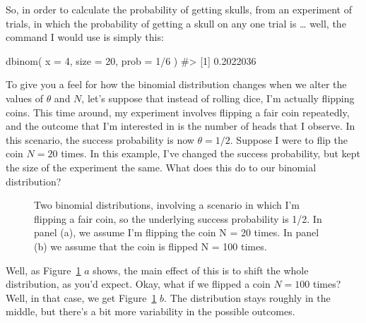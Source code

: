 \documentclass[
  letterpaper,
  DIV=11,
  numbers=noendperiod]{scrreprt}
\newenvironment{Shaded}{\begin{snugshade}}{\end{snugshade}}
\newcommand{\AttributeTok}[1]{\textcolor[rgb]{0.40,0.45,0.13}{#1}}
\newcommand{\CommentTok}[1]{\textcolor[rgb]{0.37,0.37,0.37}{#1}}
\newcommand{\DecValTok}[1]{\textcolor[rgb]{0.68,0.00,0.00}{#1}}
\newcommand{\FunctionTok}[1]{\textcolor[rgb]{0.28,0.35,0.67}{#1}}
\newcommand{\NormalTok}[1]{\textcolor[rgb]{0.00,0.23,0.31}{#1}}
\newcommand{\SpecialCharTok}[1]{\textcolor[rgb]{0.37,0.37,0.37}{#1}}
\begin{document}
So, in order to calculate the probability of getting skulls, from an
experiment of trials, in which the probability of getting a skull on any
one trial is \ldots{} well, the command I would use is simply this:

\begin{Shaded}
\begin{Highlighting}[]
\FunctionTok{dbinom}\NormalTok{( }\AttributeTok{x =} \DecValTok{4}\NormalTok{, }\AttributeTok{size =} \DecValTok{20}\NormalTok{, }\AttributeTok{prob =} \DecValTok{1}\SpecialCharTok{/}\DecValTok{6}\NormalTok{ )}
\CommentTok{\#\textgreater{} [1] 0.2022036}
\end{Highlighting}
\end{Shaded}

To give you a feel for how the binomial distribution changes when we
alter the values of \(\theta\) and \(N\), let's suppose that instead of
rolling dice, I'm actually flipping coins. This time around, my
experiment involves flipping a fair coin repeatedly, and the outcome
that I'm interested in is the number of heads that I observe. In this
scenario, the success probability is now \(\theta = 1/2\). Suppose I
were to flip the coin \(N=20\) times. In this example, I've changed the
success probability, but kept the size of the experiment the same. What
does this do to our binomial distribution?

\begin{figure}


\caption{\label{fig-4binomial2}Two binomial distributions, involving a
scenario in which I'm flipping a fair coin, so the underlying success
probability is 1/2. In panel (a), we assume I'm flipping the coin N = 20
times. In panel (b) we assume that the coin is flipped N = 100 times.}

\end{figure}%

Well, as Figure~\ref{fig-4binomial2} \(a\) shows, the main effect of
this is to shift the whole distribution, as you'd expect. Okay, what if
we flipped a coin \(N=100\) times? Well, in that case, we get
Figure~\ref{fig-4binomial2} \(b\). The distribution stays roughly in the
middle, but there's a bit more variability in the possible outcomes.
\end{document}
